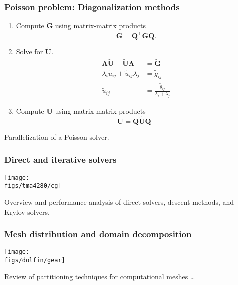 \begin{frame}
  \frametitle{Poisson problem: Diagonalization methods}
  \begin{enumerate}
  \item Compute $\tilde{\bm G}$ using matrix-matrix products
    \begin{equation*}
      \tilde{\bm G} = \bm Q^\intercal \bm G \bm Q.
    \end{equation*}
  \item Solve for $\tilde{\bm U}$.
    \begin{align*}
      \bm \Lambda \tilde{\bm U} + \tilde{\bm U} \bm \Lambda &= \tilde{\bm G} \\
      \lambda_i \tilde{u}_{ij} + \tilde{u}_{ij} \lambda_j &= \tilde{g}_{ij} \\
      \tilde{u}_{ij} &= \frac{\tilde{g}_{ij}}{\lambda_i + \lambda_j}
    \end{align*}
  \item Compute $\bm U$ using matrix-matrix products
    \begin{equation*}
      \bm U = \bm Q \tilde{\bm U} \bm Q^\intercal
    \end{equation*}
  \end{enumerate}

Parallelization of a Poisson solver.
\end{frame}

\begin{frame}
  \frametitle{Direct and iterative solvers}
  \begin{center}
    \texttt{[image: \\figs/tma4280/cg]}
  \end{center}

Overview and performance analysis of direct solvers, descent methods, and Krylov solvers.
\end{frame}

\begin{frame}
  \frametitle{Mesh distribution and domain decomposition}

  \begin{center}
    \texttt{[image: \\figs/dolfin/gear]}
  \end{center}

Review of partitioning techniques for computational meshes \dots
\end{frame}

